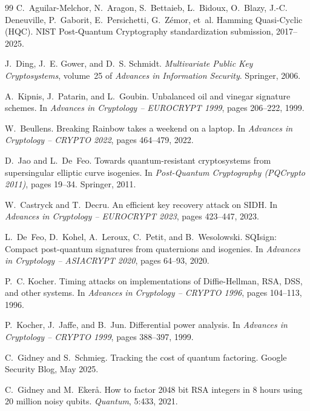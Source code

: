 \begin{thebibliography}{99}
 C.~Aguilar-Melchor, N.~Aragon, S.~Bettaieb, L.~Bidoux, O.~Blazy, J.-C. Deneuville, P.~Gaborit, E.~Persichetti, G.~Z\'{e}mor, et~al.
\newblock Hamming Quasi-Cyclic (HQC).
\newblock NIST Post-Quantum Cryptography standardization submission, 2017--2025.

 J.~Ding, J.~E. Gower, and D.~S. Schmidt.
\newblock \emph{Multivariate Public Key Cryptosystems}, volume~25 of \emph{Advances in Information Security}.
\newblock Springer, 2006.

 A.~Kipnis, J.~Patarin, and L.~Goubin.
\newblock Unbalanced oil and vinegar signature schemes.
\newblock In \emph{Advances in Cryptology -- EUROCRYPT 1999}, pages 206--222, 1999.

 W.~Beullens.
\newblock Breaking Rainbow takes a weekend on a laptop.
\newblock In \emph{Advances in Cryptology -- CRYPTO 2022}, pages 464--479, 2022.

 D.~Jao and L.~De~Feo.
\newblock Towards quantum-resistant cryptosystems from supersingular elliptic curve isogenies.
\newblock In \emph{Post-Quantum Cryptography (PQCrypto 2011)}, pages 19--34. Springer, 2011.

 W.~Castryck and T.~Decru.
\newblock An efficient key recovery attack on SIDH.
\newblock In \emph{Advances in Cryptology -- EUROCRYPT 2023}, pages 423--447, 2023.

 L.~De~Feo, D.~Kohel, A.~Leroux, C.~Petit, and B.~Wesolowski.
\newblock SQIsign: Compact post-quantum signatures from quaternions and isogenies.
\newblock In \emph{Advances in Cryptology -- ASIACRYPT 2020}, pages 64--93, 2020.

 P.~C. Kocher.
\newblock Timing attacks on implementations of Diffie-Hellman, RSA, DSS, and other systems.
\newblock In \emph{Advances in Cryptology -- CRYPTO 1996}, pages 104--113, 1996.

 P.~Kocher, J.~Jaffe, and B.~Jun.
\newblock Differential power analysis.
\newblock In \emph{Advances in Cryptology -- CRYPTO 1999}, pages 388--397, 1999.

 C.~Gidney and S.~Schmieg.
\newblock Tracking the cost of quantum factoring.
\newblock Google Security Blog, May 2025.

 C.~Gidney and M.~Eker\aa.
\newblock How to factor 2048 bit RSA integers in 8 hours using 20 million noisy qubits.
\newblock \emph{Quantum}, 5:433, 2021.


\end{thebibliography}
